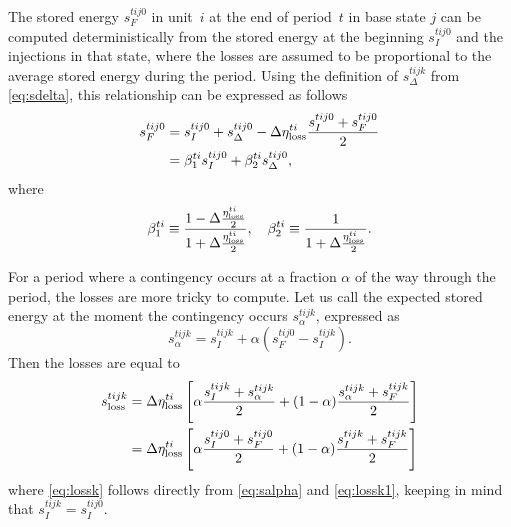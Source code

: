 \documentclass[12pt]{article}
\numberwithin{equation}{section}
\numberwithin{table}{section}
\numberwithin{figure}{section}
\begin{document}
The stored energy $s_F^{tij0}$ in unit~$i$ at the end of period~$t$ in base state $j$ can be computed deterministically from the stored energy at the beginning $s_I^{tij0}$ and the injections in that state, where the losses are assumed to be proportional to the average stored energy during the period. Using the definition of $s_\Delta^{tijk}$ from \eqref{eq:sdelta}, this relationship can be expressed as follows
\begin{align}
s_F^{tij0} &= s_I^{tij0} + s_\Delta^{tij0} - \Delta \eta^{ti}_{\rm loss} \frac{s_I^{tij0}+ s_F^{tij0}}{2} \\
 &= \beta_1^{ti} s_I^{tij0} + \beta_2^{ti} s_\Delta^{tij0}, \label{eq:sf0}
\end{align}
where
\begin{equation}
\beta_1^{ti} \equiv \frac{1 - \Delta \frac{\eta^{ti}_{\rm loss}}{2}}{1 + \Delta \frac{\eta^{ti}_{\rm loss}}{2}}, \quad
\beta_2^{ti} \equiv \frac{1}{1 + \Delta \frac{\eta^{ti}_{\rm loss}}{2}}.
\label{eq:beta1and2}
\end{equation}

For a period where a contingency occurs at a fraction $\alpha$ of the way through the period, the losses are more tricky to compute. Let us call the expected stored energy at the moment the contingency occurs $s_\alpha^{tijk}$, expressed as
\begin{equation}
s_\alpha^{tijk}  = s_I^{tijk} + \alpha (s_F^{tij0} - s_I^{tijk}). \label{eq:salpha}
\end{equation}
Then the losses are equal to
\begin{align}
s_{\rm loss}^{tijk} &= \Delta \eta^{ti}_{\rm loss} \left[ \alpha \frac{s_I^{tijk} + s_\alpha^{tijk}}{2} + (1-\alpha) \frac{s_\alpha^{tijk} + s_F^{tijk}}{2} \right] \label{eq:lossk1} \\
&= \Delta \eta^{ti}_{\rm loss} \left[ \alpha \frac{s_I^{tij0} + s_F^{tij0}}{2} + (1-\alpha) \frac{s_I^{tijk} + s_F^{tijk}}{2} \right] \label{eq:lossk}
\end{align}
where \eqref{eq:lossk} follows directly from \eqref{eq:salpha} and \eqref{eq:lossk1}, keeping in mind that $s_I^{tijk} = s_I^{tij0}$.
\end{document}
